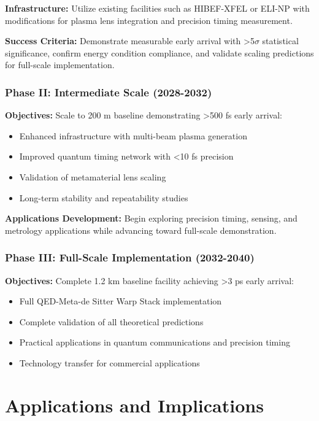 \documentclass[aps,prl,reprint,groupedaddress,floatfix]{revtex4-1}
\begin{document}
\textbf{Infrastructure:} Utilize existing facilities such as HIBEF-XFEL or ELI-NP with modifications for plasma lens integration and precision timing measurement.

\textbf{Success Criteria:} Demonstrate measurable early arrival with >5$\sigma$ statistical significance, confirm energy condition compliance, and validate scaling predictions for full-scale implementation.

\subsubsection{Phase II: Intermediate Scale (2028-2032)}

\textbf{Objectives:} Scale to 200 m baseline demonstrating >500 fs early arrival:
\begin{itemize}
    \item Enhanced infrastructure with multi-beam plasma generation
    \item Improved quantum timing network with <10 fs precision
    \item Validation of metamaterial lens scaling
    \item Long-term stability and repeatability studies
\end{itemize}

\textbf{Applications Development:} Begin exploring precision timing, sensing, and metrology applications while advancing toward full-scale demonstration.

\subsubsection{Phase III: Full-Scale Implementation (2032-2040)}

\textbf{Objectives:} Complete 1.2 km baseline facility achieving >3 ps early arrival:
\begin{itemize}
    \item Full QED-Meta-de Sitter Warp Stack implementation
    \item Complete validation of all theoretical predictions
    \item Practical applications in quantum communications and precision timing
    \item Technology transfer for commercial applications
\end{itemize}

\section{Applications and Implications}
\end{document}
